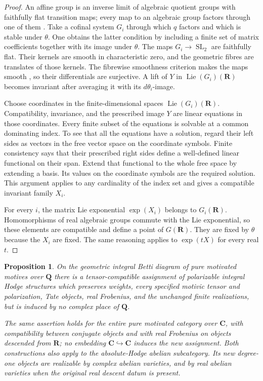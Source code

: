 \documentclass[11pt]{article}
\newtheorem{proposition}[theorem]{Proposition}
\theoremstyle{definition}\newtheorem{definition}[theorem]{Definition}
\theoremstyle{remark}\newtheorem{remark}[theorem]{Remark}
\newcommand{\Q}{\mathbf Q}\newcommand{\Z}{\mathbf Z}
\newcommand{\R}{\mathbf R}\newcommand{\C}{\mathbf C}
\DeclareMathOperator{\Lie}{Lie}\DeclareMathOperator{\trdeg}{trdeg}
\DeclareMathOperator{\SL}{SL}\DeclareMathOperator{\End}{End}
\begin{document}
\begin{proof}
An affine group is an inverse limit of algebraic quotient groups with
faithfully flat transition maps; every map to an algebraic group factors
through one of them \cite[Proposition~2.6 and Corollary~2.7, pp.~19--20]{DeligneMilne}.
Take a cofinal system $G_i$ through which $q$ factors and which is stable under
$\theta$. One obtains the latter condition by including a finite set of
matrix coefficients together with its image under $\theta$.
The maps $G_i\to\SL_2$ are faithfully flat. Their kernels are smooth in
characteristic zero, and the geometric fibres are translates of those
kernels. The fibrewise smoothness criterion makes the maps smooth
\cite[Tags 047N and 01V8]{StacksE}, so their differentials are surjective.
A lift of $Y$ in
$\Lie(G_i)(\R)$ becomes invariant after averaging it with its
$d\theta_i$-image.

Choose coordinates in the finite-dimensional spaces $\Lie(G_i)(\R)$.
Compatibility, invariance, and the prescribed image $Y$ are linear equations
in those coordinates. Every finite subset of the equations is solvable at
a common dominating index. To see that all the equations have a solution,
regard their left sides as vectors in the free vector space on the coordinate
symbols. Finite consistency says that their prescribed right sides define a
well-defined linear functional on their span. Extend that functional to the
whole free space by extending a basis. Its values on the coordinate symbols
are the required solution. This argument applies to any cardinality of the
index set and gives a compatible invariant family $X_i$.

For every $i$, the matrix Lie exponential $\exp(X_i)$ belongs to $G_i(\R)$.
Homomorphisms of real algebraic groups commute with the Lie exponential,
so these elements are compatible and define a point of $G(\R)$. They are
fixed by $\theta$ because the $X_i$ are fixed. The same reasoning applies to
$\exp(tX)$ for every real $t$.
\end{proof}

\begin{proposition}\label{prop:global-hodge-deformation}
On the geometric integral Betti diagram of pure motivated motives over $\Q$
there is a tensor-compatible assignment of polarizable integral Hodge
structures which preserves weights, every specified motivic tensor and
polarization, Tate objects, real Frobenius, and the unchanged finite
realizations, but is induced by no complex place of $\Q$.

The same assertion holds for the entire pure motivated category over $\C$,
with compatibility between conjugate objects and with real Frobenius on
objects descended from $\R$; no embedding $\C\hookrightarrow\C$ induces the
new assignment. Both constructions also apply to the absolute-Hodge abelian
subcategory. Its new degree-one objects are realizable by complex abelian
varieties, and by real abelian varieties when the original real descent datum
is present.
\end{proposition}
\end{document}
